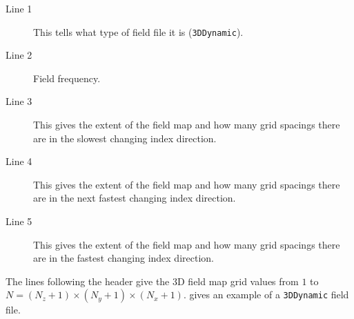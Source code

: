 \begin{description}
\item[Line 1] This tells \opalt what type of field file it is (\texttt{3DDynamic}).
\item[Line 2] Field frequency.
\item[Line 3] This gives the extent of the field map and how many grid spacings there are in the slowest changing
  index direction.
\item[Line 4] This gives the extent of the field map and how many grid spacings there are in the next fastest changing
  index direction.
\item[Line 5] This gives the extent of the field map and how many grid spacings there are in the fastest changing
  index direction.
\end{description}

The lines following the header give the 3D field map grid values from $1$ to $N= (N_{z} + 1) \times (N_{y} + 1) \times (N_{x} + 1)$.
 gives an example of a \texttt{3DDynamic} field file.

